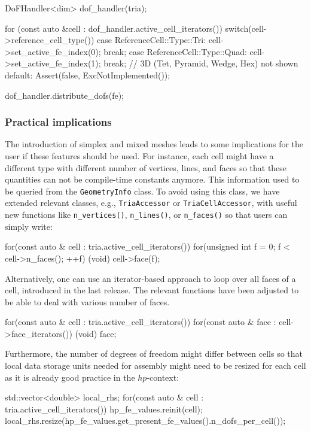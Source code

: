 \documentclass{ansarticle-preprint}
\begin{document}
\begin{c++}  
DoFHandler<dim> dof_handler(tria);

for (const auto &cell : dof_handler.active_cell_iterators())
  switch(cell->reference_cell_type())
    {
      case ReferenceCell::Type::Tri:  cell->set_active_fe_index(0); break;
      case ReferenceCell::Type::Quad: cell->set_active_fe_index(1); break;
      // 3D (Tet, Pyramid, Wedge, Hex) not shown
      default: Assert(false, ExcNotImplemented());
    }

dof_handler.distribute_dofs(fe);
\end{c++}

\subsubsection{Practical implications} 

The introduction of simplex and mixed meshes leads to some implications
for the user if these features should be used. For instance, each cell might have a different type with 
different number of vertices, lines, and faces so that these quantities can not be 
compile-time constants anymore. This information used to be queried from
the \texttt{GeometryInfo} class. To avoid using this class, we have extended
relevant classes, e.g., \texttt{TriaAccessor} or \texttt{TriaCellAccessor},
with useful new functions like \texttt{n\_vertices()}, \texttt{n\_lines()}, or
\texttt{n\_faces()} so that users can simply write:
\begin{c++}
for(const auto & cell : tria.active_cell_iterators())
  for(unsigned int f = 0; f < cell->n_faces(); ++f)
    (void) cell->face(f);
\end{c++}
Alternatively, one can use an iterator-based approach to loop over all faces
of a cell, introduced in the last release. The relevant functions have been adjusted to be able to deal with
various number of faces. 
\begin{c++}
for(const auto & cell : tria.active_cell_iterators())
  for(const auto & face : cell->face_iterators())
    (void) face;
\end{c++}
Furthermore, the number of degrees of freedom might differ between cells so that
local data storage units needed for assembly might need to be resized for each 
cell as it is already good practice in the $hp$-context:
\begin{c++}
std::vector<double> local_rhs;
for(const auto & cell : tria.active_cell_iterators())
 {
   hp_fe_values.reinit(cell);
   local_rhs.resize(hp_fe_values.get_present_fe_values().n_dofs_per_cell());
 }
\end{c++}
\end{document}
